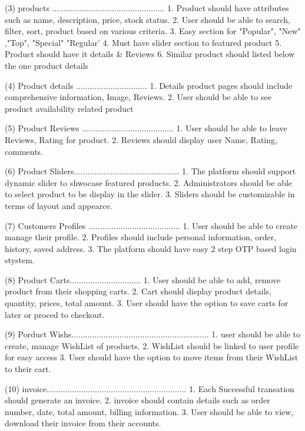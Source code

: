 (3) products .................................................
    1. Product should have attributes such as name, description, price, stock status.
    2. User should be able to search, filter, sort, product based on various criteria.
    3. Easy section for "Popular", "New" ,"Top", "Special" "Regular'
    4. Must have slider section to featured product 
    5. Product should have it details & Reviews
    6. Similar product should listed below the one product details

(4) Product details ...............................
    1. Details product pages should include comprehensive information, Image, Reviews.
    2. User should be able to see product availability related product

(5) Product Reviews ........................................
    1. User should be able to leave Reviews, Rating for product.
    2. Reviews should display user Name, Rating, comments.

(6) Product Sliders..............................................
    1. The platform should support dynamic slider to shwocase featured products.
    2. Administrators should be able to select product to be display in the slider.
    3. Sliders should be customizable in terms of layout and appearce.

(7) Customers Profiles ........................................
    1. User should be able to create manage their profile.
    2. Profiles should include personal information, order, history, saved address.
    3. The platform should have easy 2 step OTP based login stystem.

(8) Product Carts...............................
    1. User should be able to add, remove product from their shopping carts.
    2. Cart should display product details, quantity, prices, total amount.
    3. User should have the option to save carts for later or proced to checkout.

(9) Porduct Wishs............................................................
    1. user should be able to create, manage WishList of products.
    2. WishList should be linked to user profile for easy access
    3. User should have the option to move items from their WishList to their cart.

(10) invoice.............................................................
     1. Each Successful transation should generate an invoice.
     2. invoice should contain details such as order number, date, total amount, billing information.
     3. User should be able to view, download their invoice from their accounts.

